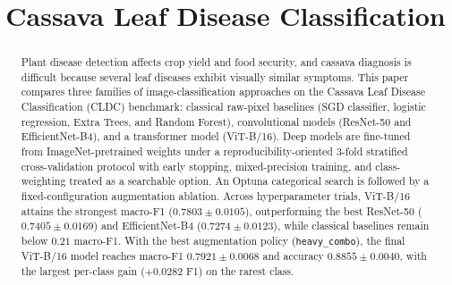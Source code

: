 \documentclass[conference]{IEEEtran}
\begin{document}
\title{Cassava Leaf Disease Classification}

\author{
\and
{}
}

\maketitle

\begin{abstract}
Plant disease detection affects crop yield and food security, and cassava diagnosis is difficult because several leaf diseases exhibit visually similar symptoms. This paper compares three families of image-classification approaches on the Cassava Leaf Disease Classification (CLDC) benchmark: classical raw-pixel baselines (SGD classifier, logistic regression, Extra Trees, and Random Forest), convolutional models (ResNet-50 and EfficientNet-B4), and a transformer model (ViT-B/16). Deep models are fine-tuned from ImageNet-pretrained weights under a reproducibility-oriented 3-fold stratified cross-validation protocol with early stopping, mixed-precision training, and class-weighting treated as a searchable option. An Optuna categorical search is followed by a fixed-configuration augmentation ablation. Across hyperparameter trials, ViT-B/16 attains the strongest macro-F1 ($0.7803 \pm 0.0105$), outperforming the best ResNet-50 ($0.7405 \pm 0.0169$) and EfficientNet-B4 ($0.7274 \pm 0.0123$), while classical baselines remain below $0.21$ macro-F1. With the best augmentation policy (\texttt{heavy\_combo}), the final ViT-B/16 model reaches macro-F1 $0.7921 \pm 0.0068$ and accuracy $0.8855 \pm 0.0040$, with the largest per-class gain ($+0.0282$ F1) on the rarest class.
\end{abstract}
\end{document}

